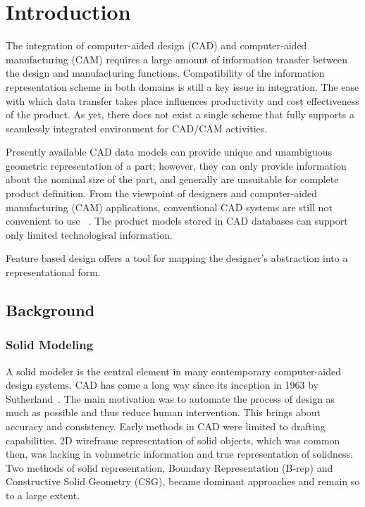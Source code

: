  \setcounter{page}{1}
\chapter{Introduction}

    The integration of computer-aided design (CAD) and computer-aided 
	manufacturing (CAM) requires a large amount of information transfer
    between the design and manufacturing functions. 
	Compatibility of the information
    representation scheme in both domains is still a key issue in integration.
    The ease with which data transfer takes place influences
	productivity and cost effectiveness of the product. As yet, there does not
	exist a single scheme that fully supports a seamlessly integrated 
	environment for CAD/CAM activities.

        Presently available CAD data models can provide unique and 
	unambiguous geometric representation of a part; however, they can
    only provide information about the nominal size of the part, and 
	generally are unsuitable for complete product definition.
	From the viewpoint of designers and computer-aided manufacturing (CAM) 
	applications, conventional CAD systems are still not convenient to 
	use ~\cite{Sheu}. The product models stored in CAD databases can support only
	limited technological information.
	

	Feature based design offers a tool for mapping the designer's abstraction
	into a representational form.

	\section{Background}

    \subsection{Solid Modeling }

	A solid modeler is the central element in many contemporary computer-aided 
	design systems. CAD has come a long way since its inception in 1963
    by Sutherland~\cite{Suther}. 
	The main motivation was to automate the process of design
    as much as possible and thus reduce human intervention. This brings
	about accuracy and consistency. Early methods in CAD were limited
    to drafting capabilities. 2D wireframe representation of solid objects,
    which was common then, was lacking in volumetric information and true
    representation of solidness. Two methods of solid representation,
	Boundary Representation (B-rep) and Constructive Solid Geometry (CSG),
	became dominant approaches and remain so to a large extent.


